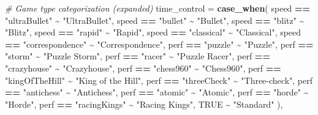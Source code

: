 \documentclass[
]{article}
\newenvironment{Shaded}{\begin{snugshade}}{\end{snugshade}}
\newcommand{\AttributeTok}[1]{\textcolor[rgb]{0.13,0.29,0.53}{#1}}
\newcommand{\CommentTok}[1]{\textcolor[rgb]{0.56,0.35,0.01}{\textit{#1}}}
\newcommand{\ConstantTok}[1]{\textcolor[rgb]{0.56,0.35,0.01}{#1}}
\newcommand{\FunctionTok}[1]{\textcolor[rgb]{0.13,0.29,0.53}{\textbf{#1}}}
\newcommand{\NormalTok}[1]{#1}
\newcommand{\SpecialCharTok}[1]{\textcolor[rgb]{0.81,0.36,0.00}{\textbf{#1}}}
\newcommand{\StringTok}[1]{\textcolor[rgb]{0.31,0.60,0.02}{#1}}
\begin{document}
\begin{Shaded}
\begin{Highlighting}[]
      \CommentTok{\# Game type categorization (expanded)}
      \AttributeTok{time\_control =} \FunctionTok{case\_when}\NormalTok{(}
\NormalTok{        speed }\SpecialCharTok{==} \StringTok{"ultraBullet"} \SpecialCharTok{\textasciitilde{}} \StringTok{"UltraBullet"}\NormalTok{,}
\NormalTok{        speed }\SpecialCharTok{==} \StringTok{"bullet"} \SpecialCharTok{\textasciitilde{}} \StringTok{"Bullet"}\NormalTok{,}
\NormalTok{        speed }\SpecialCharTok{==} \StringTok{"blitz"} \SpecialCharTok{\textasciitilde{}} \StringTok{"Blitz"}\NormalTok{,}
\NormalTok{        speed }\SpecialCharTok{==} \StringTok{"rapid"} \SpecialCharTok{\textasciitilde{}} \StringTok{"Rapid"}\NormalTok{,}
\NormalTok{        speed }\SpecialCharTok{==} \StringTok{"classical"} \SpecialCharTok{\textasciitilde{}} \StringTok{"Classical"}\NormalTok{,}
\NormalTok{        speed }\SpecialCharTok{==} \StringTok{"correspondence"} \SpecialCharTok{\textasciitilde{}} \StringTok{"Correspondence"}\NormalTok{,}
\NormalTok{        perf }\SpecialCharTok{==} \StringTok{"puzzle"} \SpecialCharTok{\textasciitilde{}} \StringTok{"Puzzle"}\NormalTok{,}
\NormalTok{        perf }\SpecialCharTok{==} \StringTok{"storm"} \SpecialCharTok{\textasciitilde{}} \StringTok{"Puzzle Storm"}\NormalTok{,}
\NormalTok{        perf }\SpecialCharTok{==} \StringTok{"racer"} \SpecialCharTok{\textasciitilde{}} \StringTok{"Puzzle Racer"}\NormalTok{,}
\NormalTok{        perf }\SpecialCharTok{==} \StringTok{"crazyhouse"} \SpecialCharTok{\textasciitilde{}} \StringTok{"Crazyhouse"}\NormalTok{,}
\NormalTok{        perf }\SpecialCharTok{==} \StringTok{"chess960"} \SpecialCharTok{\textasciitilde{}} \StringTok{"Chess960"}\NormalTok{,}
\NormalTok{        perf }\SpecialCharTok{==} \StringTok{"kingOfTheHill"} \SpecialCharTok{\textasciitilde{}} \StringTok{"King of the Hill"}\NormalTok{,}
\NormalTok{        perf }\SpecialCharTok{==} \StringTok{"threeCheck"} \SpecialCharTok{\textasciitilde{}} \StringTok{"Three{-}check"}\NormalTok{,}
\NormalTok{        perf }\SpecialCharTok{==} \StringTok{"antichess"} \SpecialCharTok{\textasciitilde{}} \StringTok{"Antichess"}\NormalTok{,}
\NormalTok{        perf }\SpecialCharTok{==} \StringTok{"atomic"} \SpecialCharTok{\textasciitilde{}} \StringTok{"Atomic"}\NormalTok{,}
\NormalTok{        perf }\SpecialCharTok{==} \StringTok{"horde"} \SpecialCharTok{\textasciitilde{}} \StringTok{"Horde"}\NormalTok{,}
\NormalTok{        perf }\SpecialCharTok{==} \StringTok{"racingKings"} \SpecialCharTok{\textasciitilde{}} \StringTok{"Racing Kings"}\NormalTok{,}
        \ConstantTok{TRUE} \SpecialCharTok{\textasciitilde{}} \StringTok{"Standard"}
\NormalTok{      ),}


\end{Highlighting}
\end{Shaded}
\end{document}
